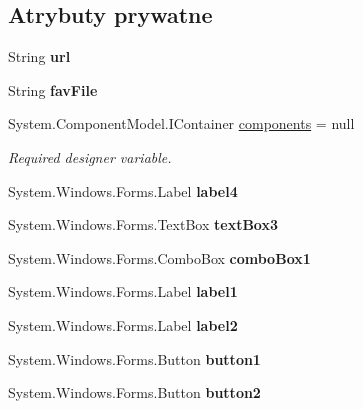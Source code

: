 \subsection*{Atrybuty prywatne}
\begin{DoxyCompactItemize}
\item 
\mbox{\label{class_windows_forms_app2_1_1_ulubione_a158b914356a9d15c8ac45b9b69bed893}} 
String {\bfseries url}
\item 
\mbox{\label{class_windows_forms_app2_1_1_ulubione_af924795e2bcc3921f678cba068ce5d31}} 
String {\bfseries fav\+File}
\item 
System.\+Component\+Model.\+I\+Container \hyperlink{class_windows_forms_app2_1_1_ulubione_a87e8bd4b55cd5b901060d298a6519aaa}{components} = null
\begin{DoxyCompactList}\small\item\em Required designer variable. \end{DoxyCompactList}\item 
\mbox{\label{class_windows_forms_app2_1_1_ulubione_a8be88683b66aa181b4bf4c353cc95c74}} 
System.\+Windows.\+Forms.\+Label {\bfseries label4}
\item 
\mbox{\label{class_windows_forms_app2_1_1_ulubione_a28b7e74e07ba7909f6eab3a7884cd2ad}} 
System.\+Windows.\+Forms.\+Text\+Box {\bfseries text\+Box3}
\item 
\mbox{\label{class_windows_forms_app2_1_1_ulubione_aaba3754d784a966aced4b4688ef68bf8}} 
System.\+Windows.\+Forms.\+Combo\+Box {\bfseries combo\+Box1}
\item 
\mbox{\label{class_windows_forms_app2_1_1_ulubione_ab15f5c3911cbb6ea66632c42d06f2224}} 
System.\+Windows.\+Forms.\+Label {\bfseries label1}
\item 
\mbox{\label{class_windows_forms_app2_1_1_ulubione_a502ea947bd41becb29f8c8e9bca30d4b}} 
System.\+Windows.\+Forms.\+Label {\bfseries label2}
\item 
\mbox{\label{class_windows_forms_app2_1_1_ulubione_aa87978fd372bd19b7a77beddc07505cb}} 
System.\+Windows.\+Forms.\+Button {\bfseries button1}
\item 
\mbox{\label{class_windows_forms_app2_1_1_ulubione_a0dda3bc80411bbd5858d5a9785b9ed45}} 
System.\+Windows.\+Forms.\+Button {\bfseries button2}
\end{DoxyCompactItemize}


